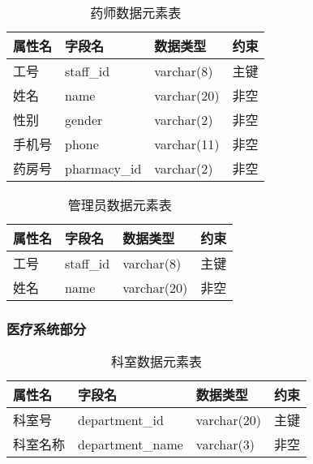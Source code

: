 \documentclass{article}
\begin{document}
\begin{table}[H]
    \centering
    \begin{tabularx}{\textwidth}{|>{\raggedright\arraybackslash}X|>{\raggedright\arraybackslash}X|>{\raggedright\arraybackslash}X|>{\raggedright\arraybackslash}X|}
    \toprule
    \textbf{属性名} & \textbf{字段名} & \textbf{数据类型} & \textbf{约束} \\ \midrule
    工号 & staff\_id & varchar(8) & 主键 \\ \midrule
    姓名 & name & varchar(20) & 非空 \\ \midrule
    性别 & gender & varchar(2) & 非空 \\ \midrule
    手机号 & phone & varchar(11) & 非空 \\ \midrule
    药房号 & pharmacy\_id & varchar(2) & 非空 \\ \bottomrule
    \end{tabularx}
    \caption{药师数据元素表}
    \label{tab:pharmacist_user_elements}
\end{table}

\begin{table}[H]
    \centering
    \begin{tabularx}{\textwidth}{|>{\raggedright\arraybackslash}X|>{\raggedright\arraybackslash}X|>{\raggedright\arraybackslash}X|>{\raggedright\arraybackslash}X|}
    \toprule
    \textbf{属性名} & \textbf{字段名} & \textbf{数据类型} & \textbf{约束} \\ \midrule
    工号 & staff\_id & varchar(8) & 主键 \\ \midrule
    姓名 & name & varchar(20) & 非空 \\ \bottomrule
    \end{tabularx}
    \caption{管理员数据元素表}
    \label{tab:admin_user_elements}
\end{table}

\subsubsection{医疗系统部分}

\begin{table}[H]
    \centering
    \begin{tabularx}{\textwidth}{|>{\raggedright\arraybackslash}X|>{\raggedright\arraybackslash}X|>{\raggedright\arraybackslash}X|>{\raggedright\arraybackslash}X|}
    \toprule
    \textbf{属性名} & \textbf{字段名} & \textbf{数据类型} & \textbf{约束} \\ \midrule
    科室号 & department\_id & varchar(20) & 主键 \\ \midrule
    科室名称 & department\_name & varchar(3) & 非空 \\ \bottomrule
    \end{tabularx}
    \caption{科室数据元素表}
    \label{tab:department_elements}
\end{table}
\end{document}
